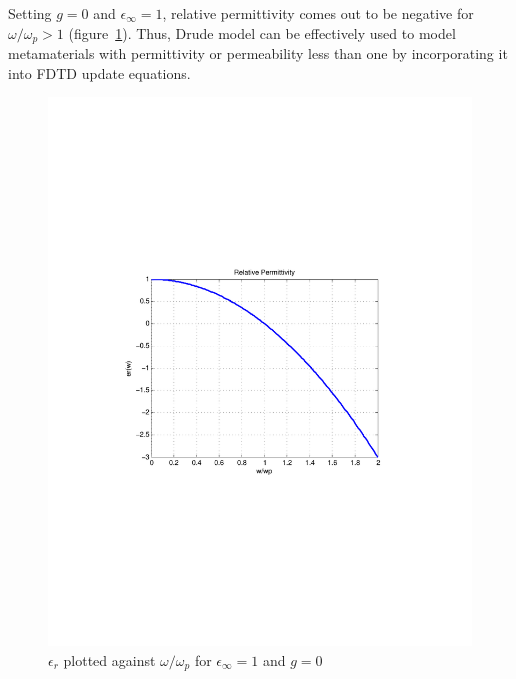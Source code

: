 Setting $g=0$ and $\epsilon_\infty=1$, relative permittivity comes out to be negative for $\omega/\omega_p > 1$ (figure~\ref{DrudeModel_er}). Thus, Drude model can be effectively used to model metamaterials with permittivity or permeability less than one by incorporating it into FDTD update equations.
\begin{figure}[H]
\centering
\includegraphics[scale=0.8, trim=4cm 8.5cm 4cm 8.5cm, clip]{Figures/FigCh03_DrudeModel_er.pdf}
\caption{$\epsilon_r$ plotted against $\omega/\omega_p$ for $\epsilon_\infty=1$ and $g=0$}
\label{DrudeModel_er}
\end{figure}

